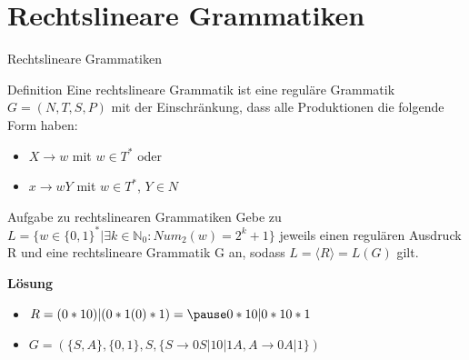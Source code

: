 \section{Rechtslineare Grammatiken}
\begin{frame}{Rechtslineare Grammatiken}
	\begin{block}{Definition}
		Eine rechtslineare Grammatik ist eine reguläre Grammatik $G=(N,T,S,P)$ mit der Einschränkung, dass alle Produktionen die folgende Form haben:
		\begin{itemize}
			\item $X \rightarrow w$ mit $w \in T^*$ oder
			\item $x\rightarrow wY$ mit $w \in T^*$, $Y \in N$
		\end{itemize}
	\end{block}
\end{frame}

\begin{frame}
	\begin{taskblock}{Aufgabe zu rechtslinearen Grammatiken}
		Gebe zu $L = \{ w \in \{ 0,1 \}^* | \exists k \in \mathbb{N}_0: Num_2(w) = 2^k + 1 \}$ jeweils einen regulären Ausdruck R und eine rechtslineare Grammatik G an, sodass $L = \langle R \rangle = L(G)$ gilt.
	\end{taskblock}
	\pause
	\textbf{Lösung}\\		
	\begin{itemize}
		\item $R = (0*10)|(0*1(0)* 1) = \pause 0*10|0*10* 1 $ \pause
		\item $G = (\{S,A\}, \{0,1\}, S, \{S \rightarrow0S|10|1A, A \rightarrow 0A|1\})$
	\end{itemize}
\end{frame}

